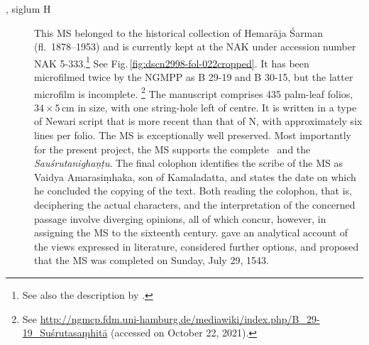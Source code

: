 \begin{description}
    \goodbreak \item[\MS{Kathmandu NAK 5-333}, siglum H]  This MS belonged to the
    historical collection of Hemarāja Śarman (fl.\ 1878--1953) and is currently
    kept at the NAK under accession number NAK 5-333.\footnote{See also the description by 
    \citet[\S 2.3]{kleb-2021b}.} See
    Fig.\,\ref{fig:dscn2998-fol-022cropped}. It has been microfilmed twice by the
    NGMPP as B 29-19 and B 30-15, but the latter microfilm is incomplete.%
    \footnote{%
    See 
    \url{http://ngmcp.fdm.uni-hamburg.de/mediawiki/index.php/B_29-19_Suśrutasaṃhitā} 
    (accessed on October 22, 2021). } The manuscript comprises 435 palm-leaf folios, 
    $34\times5$\,cm in size, with one string-hole left of centre. It is written in a type of 
    Newari script that is more recent than that of N, with approximately six lines per 
    folio. The MS is exceptionally well preserved.  Most importantly for the present 
    project, the MS supports the complete \SS\ and the \emph{Sauśrutanighaṇṭu}. The 
    final colophon identifies the scribe of the MS as Vaidya Amarasiṃhaka, son of 
    Kamaladatta, and states the date on which he concluded the copying of the text. 
    Both reading the colophon, that is, deciphering the actual characters, and the 
    interpretation of the concerned passage involve diverging opinions, all of which 
    concur, however, in assigning the MS to the sixteenth century. 
    \textcite[21--26]{kleb-2021b} gave an analytical account of the views expressed in 
    literature, considered further options, and proposed that the MS was completed on 
    Sunday, July 29, 1543.
\end{description}
%  

